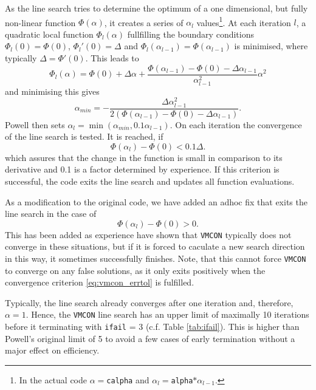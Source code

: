 \documentclass[11pt,a4paper]{report}
\newcommand{\ifail}{\mbox{\texttt{ifail}}}
\newcommand{\vmcon}{\mbox{\texttt{VMCON}}}
\begin{document}
As the line search tries to determine the optimum of a one dimensional, but
fully non-linear function $\Phi(\alpha)$, it creates a series of $\alpha_l$
values\footnote{In the actual code $\alpha=$\texttt{calpha} and $\alpha_l
  =$\texttt{alpha}$*\alpha_{l-1}$.}. At each iteration $l$, a quadratic local
function $\Phi_l(\alpha)$ fullfilling the boundary conditions $\Phi_l(0) =
\Phi(0)$, $\Phi_l'(0)=\Delta$ and $\Phi_l(\alpha_{l-1}) = \Phi(\alpha_{l-1})$
is minimised, where typically
$\Delta=\Phi'(0)$. %
This leads to
\begin{equation}
\Phi_l(\alpha) = \Phi(0) + \Delta \alpha + \frac{\Phi(\alpha_{l-1})-\Phi(0) -
  \Delta \alpha_{l-1}}{\alpha_{l-1}^2} \alpha^2
\end{equation}
and minimising this gives 
\begin{equation}
\alpha_{min} = - \frac{\Delta\alpha_{l-1}^2}{2(\Phi(\alpha_{l-1})-\Phi(0) -
  \Delta \alpha_{l-1})}.
\end{equation}
Powell then sets $\alpha_l = \min(\alpha_{min}, 0.1\alpha_{l-1})$. On each
iteration the convergence of the line search is tested. It is reached, if
\begin{equation}
\Phi(\alpha_l) - \Phi(0) < 0.1 \Delta.
\end{equation}
which assures that the change in the function is small in comparison to its
derivative and 0.1 is a factor determined by experience. If this criterion is
successful, the code exits the line search and updates all function
evaluations.

As a modification to the original code, we have added an adhoc fix that exits
the line search in the case of
\begin{equation}
\Phi(\alpha_l) - \Phi(0) > 0.
\end{equation}
This has been added as experience have shown that \vmcon\/ typically does not
converge in these situations, but if it is forced to caculate a new search
direction in this way, it sometimes successfully finishes. Note, that this
cannot force \vmcon\/ to converge on any false solutions, as it only exits
positively when the convergence criterion \ref{eq:vmcon_errtol} is fulfilled.

Typically, the line search already converges after one iteration and,
therefore, $\alpha = 1$. Hence, the \vmcon\/ line search has an upper limit of
maximally 10 iterations before it terminating with \ifail\/ = 3 (c.f. Table
\ref{tab:ifail}). This is higher than Powell's original limit of 5 to avoid a
few cases of early termination without a major effect on efficiency.
\end{document}
